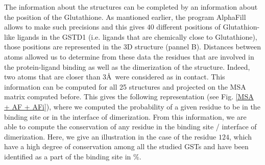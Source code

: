 \noindent The information about the structures can be completed by an information about the position of the Glutathione. As mantioned earlier, the program AlphaFill allows to make such precisions and this gives $40$ different positions of Glutathion-like ligands in the GSTD1 (i.e. ligands that are chemically close to Glutathione), those positions are represented in the 3D structure (pannel B). Distances between atoms allowed us to determine from these data the residues that are involved in the protein-ligand binding as well as the dimerization of the structure. Indeed, two atoms that are closer than $3$\AA ~were considered as in contact. This information can be computed for all 25 structures and projected on the MSA matrix computed before. This gives the following representation (see Fig. \ref{MSA + AF + AFi}), where we computed the probability of a given residue to be in the binding site or in the interface of dimerization. From this information, we are able to compute the conservation of any residue in the binding site / interface of dimerization. Here, we give an illustration in the case of the residue $124$, which have a high degree of conservation among all the studied GSTs and have been identified as a part of the binding site in $\%$.

